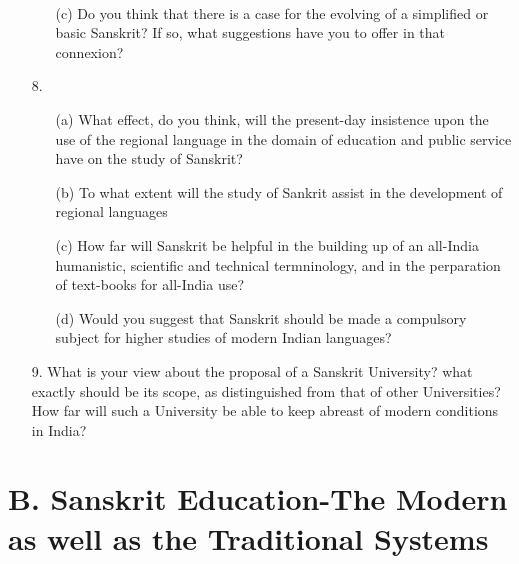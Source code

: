 {\rm 
\begin{itemize} 
\item[~]
\begin{itemize}
\item[(c)]  Do you think that there is a case for the evolving of a simplified or basic Sanskrit? If so, what suggestions have you to offer in that connexion?
            \end{itemize}

 \item[8.] \begin{itemize}
           \item[(a)] What effect, do you think, will the present-day insistence upon the use of the regional language in the domain of education and public service have on the study of Sanskrit? 
            
          \item[(b)] To what extent will the study of Sankrit assist in the development of regional languages %

         \item[(c)] How far will Sanskrit be helpful in the building up of an all-India humanistic, scientific and technical termninology, and in the perparation of text-books for all-India use?
            
        \item[(d)] Would you suggest that Sanskrit should be made a compulsory subject for higher studies of modern Indian languages?
       \end{itemize}   
             
\item[9.] What is your view about the proposal of a Sanskrit University? what exactly should be its scope, as distinguished from that of other Universities?  How far will such a University be able to keep abreast of modern conditions in India?                      
\end{itemize}
}


{\section*{{\rm\bfseries B. Sanskrit Education-The Modern as well as the Traditional Systems}}}

